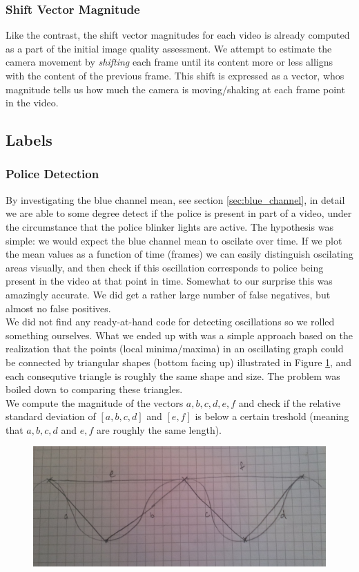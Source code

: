 \subsubsection{Shift Vector Magnitude}
%
Like the contrast, the shift vector magnitudes for each video is already computed as a part of the initial image quality assessment. We attempt to estimate the camera movement by \textit{shifting} each frame until its content more or less alligns with the content of the previous frame. This shift is expressed as a vector, whos magnitude tells us how much the camera is moving/shaking at each frame point in the video.
%
\subsection{Labels}
%

%
\subsubsection{Police Detection}\label{sec:police_detection}
%
By investigating the blue channel mean, see section \ref{sec:blue_channel}, in detail we are able to some degree detect if the police is present in part of a video, under the circumstance that the police blinker lights are active. The hypothesis was simple: we would expect the blue channel mean to oscilate over time. If we plot the mean values as a function of time (frames) we can easily distinguish oscilating areas visually, and then check if this oscillation corresponds to police being present in the video at that point in time. Somewhat to our surprise this was amazingly accurate. We did get a rather large number of false negatives, but almost no false positives.\\
We did not find any ready-at-hand code for detecting oscillations so we rolled something ourselves. What we ended up with was a simple approach based on the realization that the points (local minima/maxima) in an oscillating graph could be connected by triangular shapes (bottom facing up) illustrated in Figure \ref{fig:triangles}, and each consequtive triangle is roughly the same shape and size. The problem was boiled down to comparing these triangles.\\
We compute the magnitude of the vectors $a,b,c,d,e,f$ and check if the relative standard deviation of $[a,b,c,d]$ and $[e,f]$ is below a certain treshold (meaning that $a,b,c,d$ and $e,f$ are roughly the same length).
%
\begin{figure}
     \centering
     \includegraphics[width=1.05\textwidth]{img/triangles.jpg}
     \caption{}\label{fig:triangles}
\end{figure}
%
